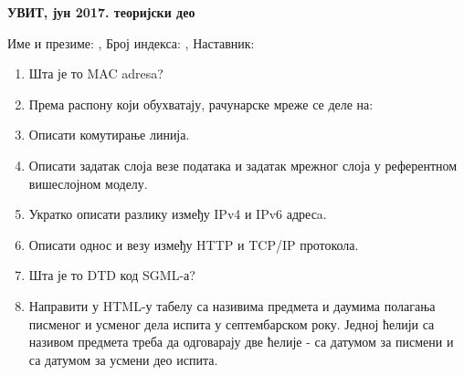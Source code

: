 \documentclass[a4paper]{article}
\begin{document}
\begin{center}
\textbf{УВИТ, јун 2017. теоријски део}  
\end{center}
Име и презиме: \hrulefill, Број индекса: \hrulefill, Наставник: \hrulefill 
\begin{enumerate}

\item Шта је то MAC adresa?

\hrulefill

\hrulefill

\hrulefill

\item Према распону који обухватају, рачунарске мреже се деле на:

\hrulefill

\hrulefill

\hrulefill

\item Описати комутирање линија.

\hrulefill

\hrulefill

\hrulefill

\item Описати задатак слоја везе података и задатак мрежног слоја у референтном вишеслојном моделу.

\hrulefill

\hrulefill

\hrulefill

\item Укратко описати разлику између IPv4 и IPv6 адресa.

\hrulefill

\hrulefill

\hrulefill

\item Описати однос и везу између HTTP и TCP/IP протокола. 

\hrulefill

\hrulefill

\hrulefill

\item Шта је то DTD код SGML-а?

\hrulefill

\hrulefill

\hrulefill

\item Направити у HTML-у табелу са називима предмета и даумима полагања писменог и усменог дела испита у септембарском року. 
Једној ћелији са називом предмета треба да одговарају две ћелије - са датумом за писмени и са датумом за усмени део испита.


\end{enumerate}
\end{document}
